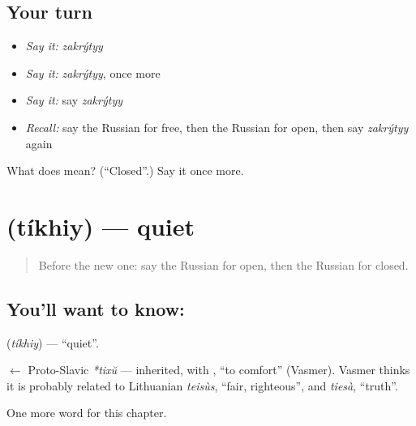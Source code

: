 \subsection*{Your turn}
\begin{itemize}
\raggedright
  \item \emph{Say it:} \emph{zakrýtyy}
  \item \emph{Say it:} \emph{zakrýtyy}, once more
  \item \emph{Say it:} say \emph{zakrýtyy}
  \item \emph{Recall:} say the Russian for free, then the Russian for open, then say \emph{zakrýtyy} again
\end{itemize}

\begin{tcolorbox}[breakable,colback=teal!4,colframe=teal!35!black,title={Before you move on}]
What does  mean? (\textquotedblleft{}Closed\textquotedblright{}.) Say it once more.
\end{tcolorbox}
\section[\texorpdfstring{\ru{тихий} (tíkhiy)}{тихий (tíkhiy)}]{ (tíkhiy) — quiet}

\label{lesson:RU-C125-quiet}



\begin{quote}
Before the new one: say the Russian for open, then the Russian for closed.
\end{quote}

\subsection*{You'll want to know: }
\textbf{} (\emph{tíkhiy}) — \textquotedblleft{}quiet\textquotedblright{}.

\begin{cousinweb}
\textbf{} $\leftarrow$ Proto-Slavic \emph{*tixŭ} — inherited, with \emph{}, \textquotedblleft{}to comfort\textquotedblright{} (Vasmer). Vasmer thinks it is probably related to Lithuanian \emph{teisùs}, \textquotedblleft{}fair, righteous\textquotedblright{}, and \emph{tiesà}, \textquotedblleft{}truth\textquotedblright{}.
\end{cousinweb}

\begin{grammarlens}[title={What you've built}]
One more word for this chapter.
\end{grammarlens}

